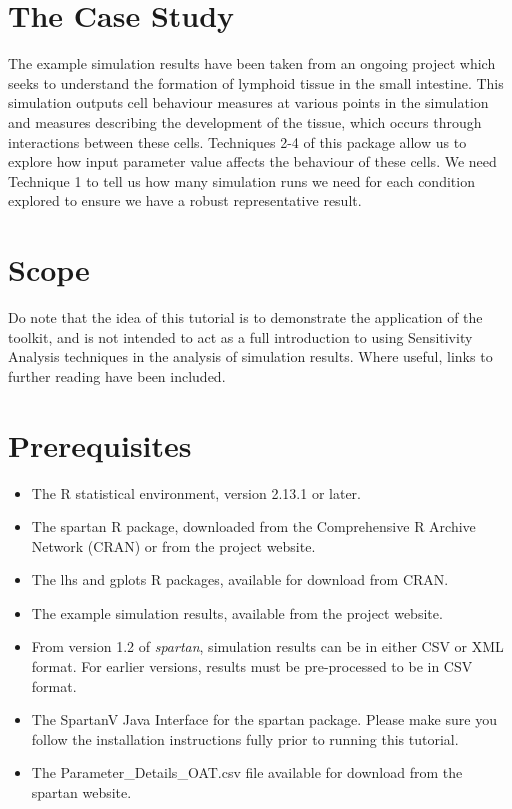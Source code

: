 \documentclass[a4paper,11pt]{article}
\begin{document}
\section{The Case Study}
\noindent The example simulation results have been taken from an ongoing project which seeks to understand the formation of lymphoid tissue in the small intestine. This simulation outputs cell behaviour measures at various points in the simulation and measures describing the development of the tissue, which occurs through interactions between these cells. Techniques 2-4 of this package allow us to explore how input parameter value affects the behaviour of these cells. We need Technique 1 to tell us how many simulation runs we need for each condition explored to ensure we have a robust representative result.

\section{Scope}
\noindent Do note that the idea of this tutorial is to demonstrate the application of the toolkit, and is not intended to act as a full introduction to using Sensitivity Analysis techniques in the analysis of simulation results. Where useful, links to further reading have been included.

\section{Prerequisites}
\begin{itemize}
\item The R statistical environment, version 2.13.1 or later.
\item The spartan R package, downloaded from the Comprehensive R Archive Network (CRAN) or from the project website.
\item The lhs and gplots R packages, available for download from CRAN.
\item The example simulation results, available from the project website.
\item From version 1.2 of \textit{spartan}, simulation results can be in either CSV or XML format. For earlier versions, results must be pre-processed to be in CSV format.
\item The SpartanV Java Interface for the spartan package. Please make sure you follow the installation instructions fully prior to running this tutorial.
\item The Parameter\_Details\_OAT.csv file available for download from the spartan website.
\end{itemize}
\end{document}
